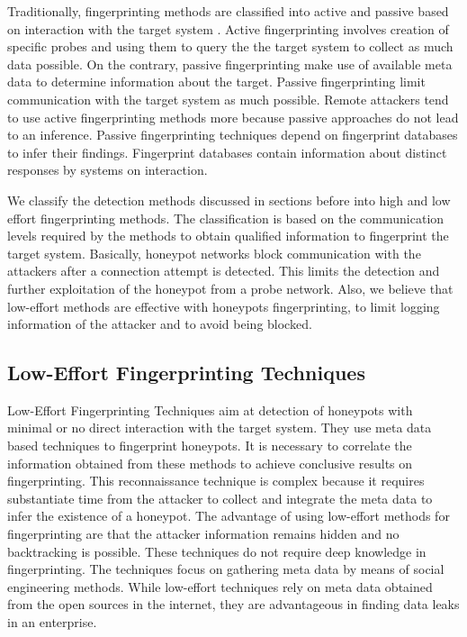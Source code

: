 \documentclass[../main.tex]{subfiles}
\begin{document}
Traditionally, fingerprinting methods are classified into active and passive based on interaction with the target system \cite{spitzner}. Active fingerprinting involves creation of specific probes and using them to query the the target system to collect as much data possible. On the contrary, passive fingerprinting  make use of available meta data to determine information about the target. Passive fingerprinting limit communication with the target system as much possible. Remote attackers tend to use active fingerprinting methods more because passive approaches do not lead to an inference. Passive fingerprinting techniques depend on fingerprint databases to infer their findings. Fingerprint databases contain information about distinct responses by systems on interaction.
   
We classify the detection methods discussed in sections before into high and low effort fingerprinting methods. The classification is based on the communication levels required by the methods to obtain qualified information to fingerprint the target system. Basically, honeypot networks block communication with the attackers after a connection attempt is detected. This limits the detection and further exploitation of the honeypot from a probe network. Also, we believe that low-effort methods are effective with honeypots fingerprinting, to limit logging information of the attacker and to avoid being blocked.  

 \subsection{Low-Effort Fingerprinting Techniques}
 Low-Effort Fingerprinting Techniques aim at detection of honeypots with minimal or no direct interaction with the target system. They use meta data based techniques to fingerprint honeypots. It is necessary to correlate the information obtained from these methods to achieve conclusive results on fingerprinting. This reconnaissance technique is complex because it requires substantiate time from the attacker to collect and integrate the meta data to infer the existence of a honeypot. The advantage of using low-effort methods for fingerprinting are that the attacker information remains hidden and no backtracking is possible. These techniques do not require deep knowledge in fingerprinting. The techniques focus on gathering meta data by means of social engineering methods. While low-effort techniques rely on meta data obtained from the open sources in the internet, they are advantageous in finding data leaks in an enterprise. 
 
\end{document}
